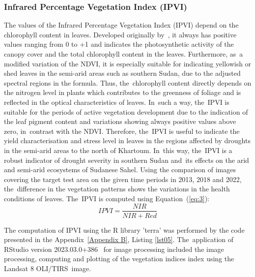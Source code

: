 \documentclass[jimaging,article,accept,pdftex,moreauthors]{Definitions/mdpi}
\begin{document}

\subsubsection{Infrared Percentage Vegetation Index (IPVI)}

The values of the Infrared Percentage Vegetation Index (IPVI) depend on the chlorophyll content in leaves. Developed originally by~\cite{CRIPPEN199071}, it always has positive values ranging from 0 to +1 and indicates the photosynthetic activity of the canopy cover and the total chlorophyll content in the leaves. Furthermore, as~a modified variation of the NDVI, it is especially suitable for indicating yellowish or shed leaves in the semi-arid areas such as southern Sudan, due to the adjusted spectral regions in the formula. Thus, the~chlorophyll content directly depends on the nitrogen level in plants which contributes to the greenness of foliage and is reflected in the optical characteristics of leaves. In~such a way, the~IPVI is suitable for the periods of active vegetation development due to the indication of the leaf pigment content and variations showing always positive values above zero, in~contrast with the NDVI. Therefore, the~IPVI is useful to indicate the yield characterisation and stress level in leaves in the regions affected by droughts in the semi-arid areas to the north of Khartoum. In~this way, the~IPVI is a robust indicator of drought severity in southern Sudan and~its effects on the arid and semi-arid ecosystems of Sudanese Sahel. Using the comparison of images covering the target test area on the given time periods in 2013, 2018 and 2022, the~difference in the vegetation patterns shows the variations in the health conditions of leaves. The~IPVI is computed using Equation~(\ref{eq:3}):
\begin{equation}\label{eq:3}
	IPVI=\dfrac{NIR}{NIR + Red}
\end{equation}

The computation of IPVI using the R library 'terra' was performed by the code presented in the Appendix~\ref{Appendix B}, Listing \ref{lst05}. The~application of RStudio version 2023.03.0+386~\cite{RStudio} for image processing included the image processing, computing and plotting of the vegetation indices index using the Landsat 8 OLI/TIRS~image. 

\end{document}
